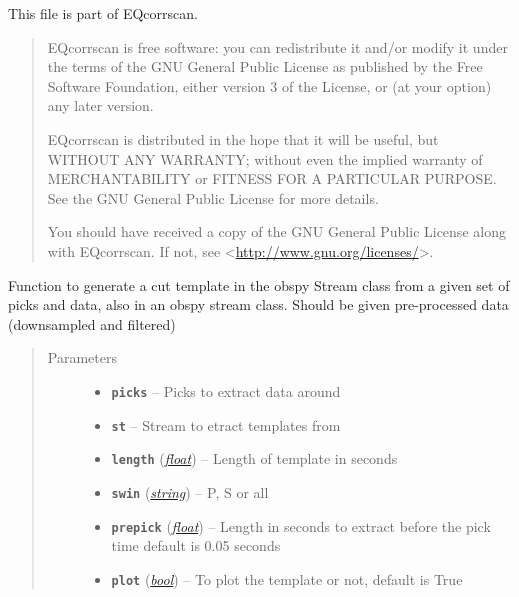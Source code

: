 \documentclass[a4paper,10pt,english]{sphinxmanual}
\begin{document}
This file is part of EQcorrscan.
\begin{quote}

EQcorrscan is free software: you can redistribute it and/or modify
it under the terms of the GNU General Public License as published by
the Free Software Foundation, either version 3 of the License, or
(at your option) any later version.

EQcorrscan is distributed in the hope that it will be useful,
but WITHOUT ANY WARRANTY; without even the implied warranty of
MERCHANTABILITY or FITNESS FOR A PARTICULAR PURPOSE.  See the
GNU General Public License for more details.

You should have received a copy of the GNU General Public License
along with EQcorrscan.  If not, see \textless{}\href{http://www.gnu.org/licenses/}{http://www.gnu.org/licenses/}\textgreater{}.
\end{quote}

\begin{fulllineitems}
\label{core:template_gen._template_gen}
Function to generate a cut template in the obspy
Stream class from a given set of picks and data, also in an obspy stream
class.  Should be given pre-processed data (downsampled and filtered)
\begin{quote}\begin{description}
\item[{Parameters}] \leavevmode\begin{itemize}
\item {} 
\textbf{\texttt{picks}} -- Picks to extract data around

\item {} 
\textbf{\texttt{st}} -- Stream to etract templates from

\item {} 
\textbf{\texttt{length}} (\href{https://docs.python.org/library/functions.html\#float}{\emph{float}}) -- Length of template in seconds

\item {} 
\textbf{\texttt{swin}} (\href{https://docs.python.org/library/string.html\#module-string}{\emph{string}}) -- P, S or all

\item {} 
\textbf{\texttt{prepick}} (\href{https://docs.python.org/library/functions.html\#float}{\emph{float}}) -- Length in seconds to extract before the pick time            default is 0.05 seconds

\item {} 
\textbf{\texttt{plot}} (\href{https://docs.python.org/library/functions.html\#bool}{\emph{bool}}) -- To plot the template or not, default is True

\end{itemize}

\end{description}\end{quote}

\end{fulllineitems}
\end{document}
